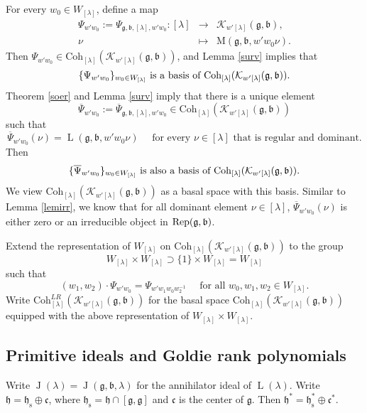 \documentclass[12pt,a4paper]{amsart}
\newcommand{\CK}{{\mathcal {K}}}
\newcommand{\oL}{\operatorname{L}}
\newcommand{\oJ}{\operatorname{J}}
\newcommand{\g}{\mathfrak g}
\newcommand{\h}{\mathfrak h}
\renewcommand{\b}{\mathfrak b}
\renewcommand{\c}{\mathfrak c}
\newcommand{\be}{\begin {equation}}
\newcommand{\ee}{\end {equation}}
\numberwithin{equation}{section}
\theoremstyle{remark}
\def\Coh{\mathrm{Coh}}
\newcommand{\Lam}{{[\lambda]}}
\begin{document}
For every $w_0\in W_\Lam$, define a map
\[
\begin{array}{rcl}
  \Psi_{w'w_0}:=  \Psi_{\g,\b,\Lam, w'w_0}: \Lam&\rightarrow  &\CK_{w' \Lam}(\g,\b), \\
   \nu&\mapsto& \mathrm M(\g,\b, w' w_0 \nu).
   \end{array}
\]
Then $ \Psi_{w'w_0}\in  \Coh_{\Lam}( \CK_{w'\Lam}(\g,\b))$, and Lemma  \ref{surv}  implies  that
\be\label{basisv}
\textrm{$\{ \Psi_{w'w_0}\}_{w_0\in W_\Lam}$ is a basis of $ \Coh_{\Lam}( \CK_{w'\Lam}(\g,\b))$.}
\ee
Theorem \ref{soer}  and Lemma  \ref{surv} imply that there is a unique element
\[
\overline \Psi_{w'w_0}:=\overline \Psi_{\g,\b, \Lam, w'w_0}\in  \Coh_{\Lam}( \CK_{ w'\Lam}(\g,\b))
\]
 such that
\begin{equation}\label{eq:hw.b}
\overline \Psi_{w'w_0}(\nu)=  \oL(\g,\b, w' w_0 \nu) \quad \textrm{ for  every $\nu\in \Lam$ that is regular and dominant.}
\end{equation}
Then
\begin{equation*}%
\textrm{$\{\overline \Psi_{w'w_0}\}_{w_0\in W_\Lam}$ is also a basis of $ \Coh_{\Lam}( \CK_{w'\Lam}(\g,\b))$.}
\end{equation*}
We view $ \Coh_{\Lam}( \CK_{w'\Lam}(\g,\b))$ as a basal space with this basis. Similar to Lemma \ref{lemirr}, we know that
for all dominant element $\nu\in \Lam$, $\overline \Psi_{w'w_0}(\nu)$ is either zero or an irreducible object in $\Rep(\g,\b)$.

Extend the representation of $W_\Lam$ on  $\Coh_{\Lam}( \CK_{w'\Lam}(\g,\b))$ to the group
\[
W_\Lam\times W_\Lam\supset \{1\}\times W_\Lam=W_\Lam
\]
 such that
\[
  (w_1, w_2)\cdot \Psi_{w'w_0}= \Psi_{w' w_1 w_0 w_2^{-1}}\quad \textrm{ for all } w_0, w_1, w_2 \in W_\Lam.
\]
Write $\Coh^{LR}_{\Lam}( \CK_{w'\Lam}(\g,\b))$ for the basal space  $\Coh_{\Lam}( \CK_{w'\Lam}(\g,\b))$ equipped with the above representation of $W_\Lam\times W_\Lam$.



\subsection{Primitive ideals and Goldie rank polynomials}\label{secGoldie}
Write
 $\oJ(\lambda)=\oJ(\g,\b,\lambda)$ for the annihilator ideal of $\oL(\lambda)$.
Write $\h=\h_{\mathrm s}\oplus \c$, where $\h_{\mathrm s}=\h\cap [\g,\g]$ and $\c$ is the center of $\g$. Then $\h^*=\h_\mathrm s^*\oplus \c^*$.
\end{document}
